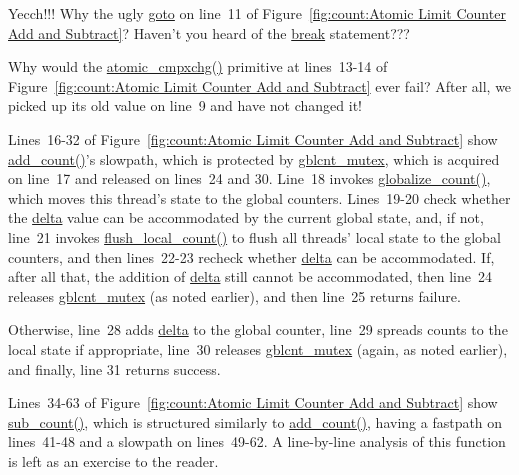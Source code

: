 \QuickQuiz{}
	Yecch!!!
	Why the ugly \url{goto} on line~11 of
	Figure~\ref{fig:count:Atomic Limit Counter Add and Subtract}?
	Haven't you heard of the \url{break} statement???
 \QuickQuizEnd

\QuickQuiz{}
	Why would the \url{atomic_cmpxchg()} primitive at lines~13-14 of
	Figure~\ref{fig:count:Atomic Limit Counter Add and Subtract}
	ever fail?
	After all, we picked up its old value on line~9 and have not
	changed it!
 \QuickQuizEnd

Lines~16-32 of
Figure~\ref{fig:count:Atomic Limit Counter Add and Subtract}
show \url{add_count()}'s slowpath, which is protected by \url{gblcnt_mutex},
which is acquired on line~17 and released on lines~24 and 30.
Line~18 invokes \url{globalize_count()}, which moves this thread's
state to the global counters.
Lines~19-20 check whether the \url{delta} value can be accommodated by
the current global state, and, if not, line~21 invokes
\url{flush_local_count()} to flush all threads' local state to the
global counters, and then lines~22-23 recheck whether \url{delta} can
be accommodated.
If, after all that, the addition of \url{delta} still cannot be accommodated,
then line~24 releases \url{gblcnt_mutex} (as noted earlier), and
then line~25 returns failure.

Otherwise, line~28 adds \url{delta} to the global counter, line~29
spreads counts to the local state if appropriate, line~30 releases
\url{gblcnt_mutex} (again, as noted earlier), and finally, line 31
returns success.

Lines~34-63 of
Figure~\ref{fig:count:Atomic Limit Counter Add and Subtract}
show \url{sub_count()}, which is structured similarly to
\url{add_count()}, having a fastpath on lines~41-48 and a slowpath on
lines~49-62.
A line-by-line analysis of this function is left as an exercise to
the reader.

